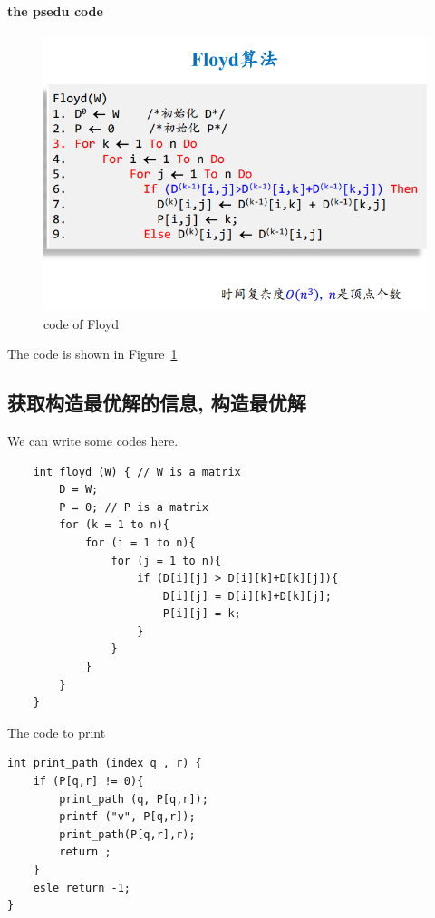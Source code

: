 \documentclass[a4paper, 10pt]{ctexart} %
\begin{document}
\paragraph{the psedu code} %
\label{par:the psedu code}
\begin{figure}[]
    \centering
    \includegraphics[scale = 0.5]{apsp3.png}
    \caption{code of Floyd}
    \label{fig:code of Floyd}
\end{figure}
The code is shown in Figure~\ref{fig:code of Floyd}

\subsection{获取构造最优解的信息, 构造最优解}
We can write some codes here.
\begin{verbatim}
    int floyd (W) { // W is a matrix
        D = W;
        P = 0; // P is a matrix
        for (k = 1 to n){
            for (i = 1 to n){
                for (j = 1 to n){
                    if (D[i][j] > D[i][k]+D[k][j]){
                        D[i][j] = D[i][k]+D[k][j];
                        P[i][j] = k;
                    }
                }
            }
        }
    }
\end{verbatim}

The code to print
\begin{verbatim}
int print_path (index q , r) {
    if (P[q,r] != 0){
        print_path (q, P[q,r]);
        printf ("v", P[q,r]);
        print_path(P[q,r],r);
        return ;
    }
    esle return -1;
}
\end{verbatim}
\end{document}
